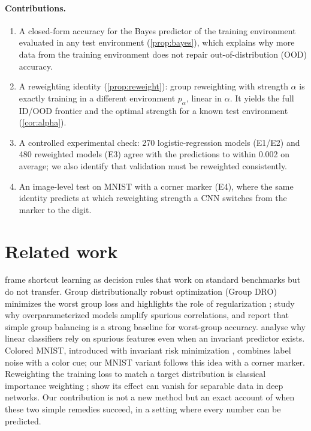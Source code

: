 \documentclass{article}
\begin{document}
\paragraph{Contributions.}
\begin{enumerate}[leftmargin=*,itemsep=1pt,topsep=2pt]
  \item A closed-form accuracy for the Bayes predictor of the training environment evaluated in any
        test environment (\cref{prop:bayes}), which explains why more data from the training
        environment does not repair out-of-distribution (OOD) accuracy.
  \item A reweighting identity (\cref{prop:reweight}): group reweighting with strength $\alpha$ is
        exactly training in a different environment $p_\alpha$, linear in $\alpha$. It yields the
        full ID/OOD frontier and the optimal strength for a known test environment (\cref{cor:alpha}).
  \item A controlled experimental check: 270 logistic-regression models (E1/E2) and 480 reweighted
        models (E3) agree with the predictions to within 0.002 on average; we also identify that
        validation must be reweighted consistently.
  \item An image-level test on MNIST with a corner marker (E4), where the same identity predicts at
        which reweighting strength a CNN switches from the marker to the digit.
\end{enumerate}

\section{Related work}
\label{sec:related}

\citet{geirhos2020shortcut} frame shortcut learning as decision rules that work on standard
benchmarks but do not transfer. Group distributionally robust optimization (Group DRO) minimizes
the worst group loss and highlights the role of regularization \cite{sagawa2020dro};
\citet{sagawa2020overparam} study why overparameterized models amplify spurious correlations, and
\citet{idrissi2022balancing} report that simple group balancing is a strong baseline for worst-group
accuracy. \citet{nagarajan2021failure} analyse why linear classifiers rely on spurious features
even when an invariant predictor exists. Colored MNIST, introduced with invariant risk minimization
\cite{arjovsky2019irm}, combines label noise with a color cue; our MNIST variant follows this idea
with a corner marker. Reweighting the training loss to match a target distribution is classical
importance weighting \cite{shimodaira2000}; \citet{byrd2019importance} show its effect can vanish
for separable data in deep networks. Our contribution is not a new method but an exact account of
when these two simple remedies succeed, in a setting where every number can be predicted.
\end{document}

